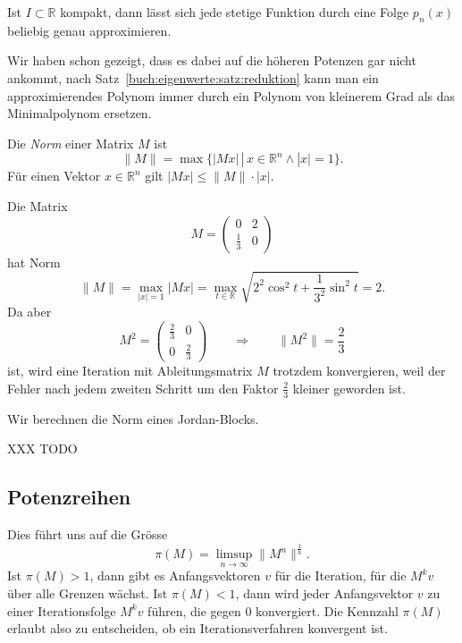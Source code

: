 \begin{satz}
Ist $I\subset\mathbb{R}$ kompakt, dann lässt sich jede stetige Funktion
durch eine Folge $p_n(x)$ beliebig genau approximieren.
\end{satz}

Wir haben schon gezeigt, dass es dabei auf die höheren Potenzen gar nicht
ankommt, nach Satz~\ref{buch:eigenwerte:satz:reduktion} kann man ein
approximierendes Polynom immer durch ein Polynom von kleinerem Grad
als das Minimalpolynom ersetzen.

\begin{definition}
%
Die {\em Norm} einer Matrix $M$ ist
\[
\|M\|
=
\max\{|Mx|\,|\, x\in\mathbb R^n\wedge |x|=1\}.
\]
Für einen Vektor $x\in\mathbb R^n$ gilt $|Mx| \le \|M\|\cdot |x|$.
\end{definition}

\begin{beispiel}
Die Matrix
\[
M=\begin{pmatrix}
0&2\\
\frac13&0
\end{pmatrix}
\]
hat Norm
\[
\|M\|
=
\max_{|x|=1} |Mx| 
=
\max_{t\in\mathbb R} \sqrt{2^2\cos^2 t +\frac1{3^2}\sin^2t} = 2.
\]
Da aber
\[
M^2 = \begin{pmatrix}
\frac{2}{3}&0\\
0&\frac{2}{3}
\end{pmatrix}
\qquad\Rightarrow\qquad \|M^2\|=\frac23
\]
ist, wird eine Iteration mit Ableitungsmatrix $M$ trotzdem
konvergieren, weil der Fehler nach jedem zweiten Schritt um den
Faktor $\frac23$ kleiner geworden ist.
\end{beispiel}

\begin{beispiel}
Wir berechnen die Norm eines Jordan-Blocks.

XXX TODO
\end{beispiel}

%
%
\subsection{Potenzreihen
\label{buch:subsection:potenzreihen}}



Dies führt uns auf die Grösse
\begin{equation}
\pi(M)
=
\limsup_{n\to\infty} \|M^n\|^\frac1n.
\label{buch:eqn:gelfand-grenzwert}
\end{equation}
Ist $\pi(M) > 1$, dann gibt es Anfangsvektoren $v$ für die Iteration,
für die $M^kv$ über alle Grenzen wächst.
Ist $\pi(M) < 1$, dann wird jeder Anfangsvektor $v$ zu einer Iterationsfolge
$M^kv$ führen, die gegen $0$ konvergiert.
Die Kennzahl $\pi(M)$ erlaubt also zu entscheiden, ob ein
Iterationsverfahren konvergent ist.
%

